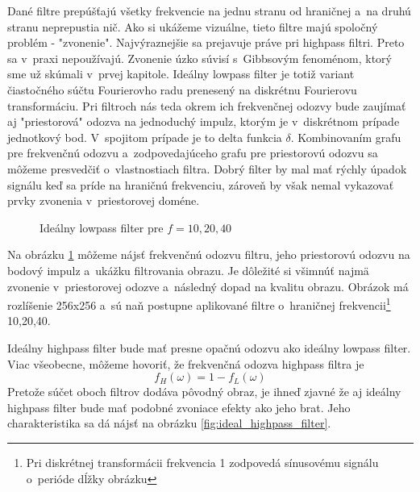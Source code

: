 Dané filtre prepúšťajú všetky frekvencie na jednu stranu od hraničnej
a~na druhú stranu neprepustia nič. Ako si ukážeme vizuálne, tieto
filtre majú spoločný problém - "zvonenie". Najvýraznejšie sa prejavuje
práve pri highpass filtri. Preto sa v~praxi nepoužívajú.
Zvonenie úzko súvisí s~Gibbsovým fenoménom, ktorý sme už skúmali
v~prvej kapitole. Ideálny lowpass filter je totiž variant čiastočného súčtu
Fourierovho radu prenesený na diskrétnu Fourierovu transformáciu. Pri filtroch
nás teda okrem ich frekvenčnej odozvy bude zaujímať aj "priestorová"
odozva na jednoduchý impulz, ktorým je v~diskrétnom prípade jednotkový
bod. V~spojitom prípade je to delta funkcia $\delta$. Kombinovaním grafu pre
frekvenčnú odozvu a~zodpovedajúceho grafu pre priestorovú odozvu
sa môžeme presvedčiť o~vlastnostiach filtra. Dobrý filter by
mal mať rýchly úpadok signálu keď sa príde na hraničnú frekvenciu,
zároveň by však nemal vykazovať prvky zvonenia v~priestorovej doméne.

\begin{figure}[htp]
    \def\path{obrazky/informatika/digitalne_filtre}
    \centering
    \caption{Ideálny lowpass filter pre $f=10,20,40$}
    \label{fig:ideal_lowpass_filter}
\end{figure}

Na obrázku \ref{fig:ideal_lowpass_filter} môžeme nájsť
frekvenčnú odozvu filtru, jeho priestorovú odozvu na bodový impulz 
a~ukážku filtrovania obrazu. Je dôležité si všimnúť najmä zvonenie 
v~priestorovej odozve a~následný dopad na kvalitu obrazu. Obrázok má
rozlíšenie 256x256 a~sú naň postupne aplikované filtre o~hraničnej
frekvencii\footnote{Pri diskrétnej transformácii
frekvencia 1 zodpovedá sínusovému signálu o~perióde dĺžky obrázku}
10,20,40.

Ideálny highpass filter bude mať presne opačnú odozvu ako ideálny
lowpass filter. Viac všeobecne, môžeme hovoriť, že frekvenčná odozva
highpass filtra je
\begin{equation}
    f_H(\omega) = 1 - f_L(\omega)
    \label{eq:highpass_filter}
\end{equation}
Pretože súčet oboch filtrov dodáva pôvodný obraz, je ihneď zjavné že
aj ideálny highpass filter bude mať podobné zvoniace efekty ako jeho
brat. Jeho charakteristika sa dá nájsť na obrázku
\ref{fig:ideal_highpass_filter}.

